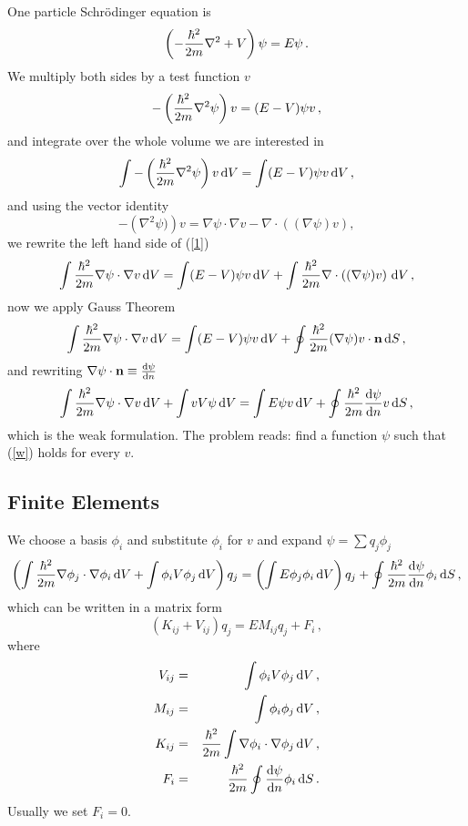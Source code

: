 One particle Schrödinger equation is 
\begin{equation*}
  \left(-{\hbar^2\over2m}\nabla^2 + V\right)\psi=E\psi\,.
\end{equation*}
We multiply both sides by a test function $v$
\begin{equation*}
  -\left({\hbar^2\over2m}\nabla^2\psi\right)v=(E-V)\psi v\,,
\end{equation*}
and integrate over the whole volume we are interested in 
\begin{equation}
  \int-\left({\hbar^2\over2m}\nabla^2\psi\right)v\,{\rm d} V=\int(E-V)\psi v\,{\rm d} V\,,  \label{1}
\end{equation}
and using the vector identity 
\begin{equation*}
  -\left(\nabla^2\psi)\right)v=\nabla \psi\cdot \nabla v - \nabla\cdot\left((\nabla \psi)v\right),
\end{equation*}
we rewrite the left hand side of (\ref{1})
\begin{equation*}
  \int{\hbar^2\over2m}\nabla\psi\cdot\nabla v\,{\rm d} V=\int(E-V)\psi v\,{\rm d} V+\int{\hbar^2\over2m}\nabla\cdot\left((\nabla \psi)v\right)\,{\rm d} V\,,
\end{equation*}
now we apply Gauss Theorem 
\begin{equation*}
  \int{\hbar^2\over2m}\nabla\psi\cdot\nabla v\,{\rm d} V=\int(E-V)\psi v\,{\rm d} V+\oint{\hbar^2\over2m}(\nabla \psi)v\cdot{\bf n}\,{\rm d} S\,,
\end{equation*}
and rewriting $\nabla\psi\cdot{\bf n}\equiv{{\rm d}\psi\over{\rm d}n}$
\begin{equation}
  \int{\hbar^2\over2m}\nabla\psi\cdot\nabla v\,{\rm d} V+ \int vV\psi\,{\rm d} V = \int E\psi v\,{\rm d} V + \oint{\hbar^2\over2m}{{\rm d}\psi\over{\rm d}n}v\,{\rm d} S\,,  \label{w}
\end{equation}
which is the weak formulation. The problem reads: find a function $\psi$ such that (\ref{w}) holds for every $v$.

\subsection{Finite Elements}

We choose a basis $\phi_i$ and substitute $\phi_i$ for $v$ and expand $\psi=\sum q_j\phi_j$
\begin{equation}
  \left(\int{\hbar^2\over2m}\nabla\phi_j\cdot\nabla\phi_i\,{\rm d} V+ \int\phi_iV\phi_j\,{\rm d} V\right)q_j = \left(\int E\phi_j\phi_i\,{\rm d} V\right)q_j +\oint{\hbar^2\over2m}{{\rm d}\psi\over{\rm d}n}\phi_i\,{\rm d} S\,,  \label{fem}
\end{equation}
which can be written in a matrix form 
\begin{equation*}
  \left(K_{ij}+V_{ij}\right)q_j=EM_{ij}q_j+F_i\,,
\end{equation*}
where 
\begin{eqnarray*}
V_{ij}&=&\int\phi_iV\phi_j\,{\rm d} V\,, \\
M_{ij}&=&\int\phi_i\phi_j\,{\rm d} V\,, \\
K_{ij}&=&{\hbar^2\over2m}\int\nabla\phi_i\cdot\nabla\phi_j\,{\rm d} V\,, \\
F_i&=&{\hbar^2\over2m}\oint{{\rm d}\psi\over{\rm d}n}\phi_i\,{\rm d} S\,. \\
\end{eqnarray*}
 Usually we set $F_i=0$.

